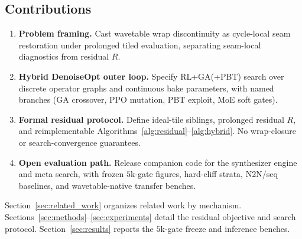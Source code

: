 \subsection{Contributions}
\label{sec:contributions}
\begin{enumerate}
  \item \textbf{Problem framing.} Cast wavetable wrap discontinuity as cycle-local seam restoration under prolonged tiled evaluation, separating seam-local diagnostics from residual $R$.
  \item \textbf{Hybrid DenoiseOpt outer loop.} Specify RL+GA(+PBT) search over discrete operator graphs and continuous bake parameters, with named branches (GA crossover, PPO mutation, PBT exploit, MoE soft gates).
  \item \textbf{Formal residual protocol.} Define ideal-tile siblings, prolonged residual $R$, and reimplementable Algorithms~\ref{alg:residual}--\ref{alg:hybrid}. No wrap-closure or search-convergence guarantees.
  \item \textbf{Open evaluation path.} Release companion code for the synthesizer engine and meta search, with frozen $5$k-gate figures, hard-cliff strata, N2N/seq baselines, and wavetable-native transfer benches.
\end{enumerate}

Section~\ref{sec:related_work} organizes related work by mechanism.
Sections~\ref{sec:methods}--\ref{sec:experiments} detail the residual objective and search protocol.
Section~\ref{sec:results} reports the $5$k-gate freeze and inference benches.
